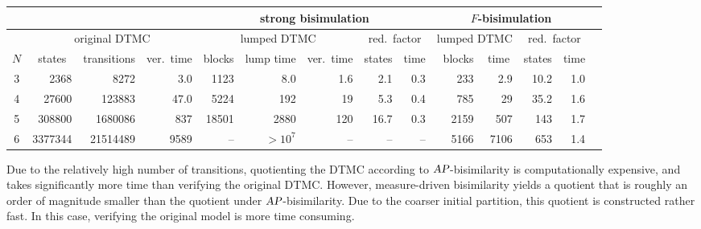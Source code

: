 \documentclass{llncs}
\begin{document}
{\scriptsize
\begin{center}
\begin{tabular}{|c|r|r|r|r|r|r|r|r|r|r|r|r|r|}
\hline 
   & \multicolumn{3}{c|}{}          & \multicolumn{5}{c|}{strong bisimulation}      & \multicolumn{4}{c|}{$F$-bisimulation} \\
\hline %
   & \multicolumn{3}{c|}{original DTMC}
                                    & \multicolumn{3}{c|}{lumped DTMC}   & \multicolumn{2}{c|}{red.\ factor}
                                                                                    & \multicolumn{2}{c|}{lumped DTMC}  
                                                                                                            & \multicolumn{2}{c|}{red.\ factor}\\[1ex]
\hline %
$N$& \multicolumn{1}{c|}{states} &transitions& ver.\ time  &blocks& lump time     & ver.\ time  &states&time&blocks& \multicolumn{1}{c|}{time} &states&time\\
\hline %
3&   2368&    8272&    3.0          & 1123&   8.0          &  1.6          & 2.1&0.3&   233 &    2.9          & 10.2          &1.0 \\
4&  27600&  123883&   47.0          & 5224& 192\phantom{.0}& 19\phantom{.0}& 5.3&0.4&   785 &   29\phantom{.0}& 35.2          &1.6 \\
5& 308800& 1680086&  837\phantom{.0}&18501&2880\phantom{.0}&120\phantom{.0}&16.7&0.3&  2159 &  507\phantom{.0}&143\phantom{.0}&1.7 \\
6&3377344&21514489& 9589\phantom{.0}&  -- &  $> 10^7$ &  --                & -- & --&  5166 & 7106\phantom{.0} & 653\phantom{.0}& 1.4 \\ \hline
\end{tabular}
\end{center}
}
%
\noindent Due to the relatively high number of transitions, quotienting the DTMC according to $\mbox{\sl AP}$-bisimilarity
is computationally expensive, and takes significantly more time than verifying the original DTMC.
However, measure-driven bisimilarity yields a quotient that is roughly an order of magnitude smaller
than the quotient under $\mbox{\sl AP}$-bisimilarity.
Due to the coarser initial partition, this quotient is constructed rather fast.
In this case, verifying the original model is more time consuming.
\end{document}
